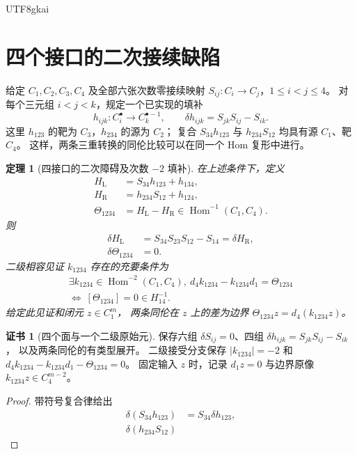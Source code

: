 \documentclass[12pt,a4paper,openany,notitlepage]{report}
\theoremstyle{plain}
\newtheorem{theorem}{定理}[chapter]
\theoremstyle{definition}
\newtheorem*{certificate}{证书}
\theoremstyle{remark}
\begin{document}
\begin{CJK*}{UTF8}{gkai}
\section{四个接口的二次接续缺陷}
\label{exp:hom:four-interfaces}

给定 $C_1,C_2,C_3,C_4$ 及全部六张次数零接续映射
$S_{ij}:C_i\to C_j$，$1\le i<j\le4$。
对每个三元组 $i<j<k$，规定一个已实现的填补
\[
 h_{ijk}:C_i^\bullet\to C_k^{\bullet-1},
 \qquad
 \delta h_{ijk}=S_{jk}S_{ij}-S_{ik}.
\]
这里 $h_{123}$ 的靶为 $C_3$，$h_{234}$ 的源为 $C_2$；
复合 $S_{34}h_{123}$ 与 $h_{234}S_{12}$ 均具有源 $C_1$、靶 $C_4$。
这样，两条三重转换的同伦比较可以在同一个 Hom 复形中进行。

\begin{theorem}[四接口的二次障碍及次数 $-2$ 填补]
\label{exp:hom:secondary-obstruction}
在上述条件下，定义
\[
 \begin{aligned}
 H_{\mathrm L}&=S_{34}h_{123}+h_{134},\\
 H_{\mathrm R}&=h_{234}S_{12}+h_{124},\\
 \Theta_{1234}
 &=H_{\mathrm L}-H_{\mathrm R}
 \in\operatorname{Hom}^{-1}(C_1,C_4).
 \end{aligned}
\]
则
\[
 \begin{aligned}
 \delta H_{\mathrm L}
 &=S_{34}S_{23}S_{12}-S_{14}
 =\delta H_{\mathrm R},\\
 \delta\Theta_{1234}&=0.
 \end{aligned}
\]
二级相容见证 $k_{1234}$ 存在的充要条件为
\[
 \begin{gathered}
 \exists k_{1234}\in\operatorname{Hom}^{-2}(C_1,C_4),\
 d_4k_{1234}-k_{1234}d_1=\Theta_{1234}\\
 \Longleftrightarrow\
 [\Theta_{1234}]=0\in H^{-1}_{14}.
 \end{gathered}
\]
给定此见证和闭元 $z\in C_1^m$，
两条同伦在 $z$ 上的差为边界
$\Theta_{1234}z=d_4(k_{1234}z)$。
\end{theorem}
\begin{certificate}[四个面与一个二级原始元]
保存六组 $\delta S_{ij}=0$、四组
$\delta h_{ijk}=S_{jk}S_{ij}-S_{ik}$，
以及两条同伦的有类型展开。
二级接受分支保存 $|k_{1234}|=-2$ 和
$d_4k_{1234}-k_{1234}d_1-\Theta_{1234}=0$。
固定输入 $z$ 时，记录 $d_1z=0$ 与边界原像 $k_{1234}z\in C_4^{m-2}$。
\end{certificate}
\begin{proof}
带符号复合律给出
\[
 \begin{aligned}
 \delta(S_{34}h_{123})
 &=S_{34}\delta h_{123},\\
 \delta(h_{234}S_{12})

\end{aligned}\]
\end{proof}
\end{CJK*}
\end{document}
